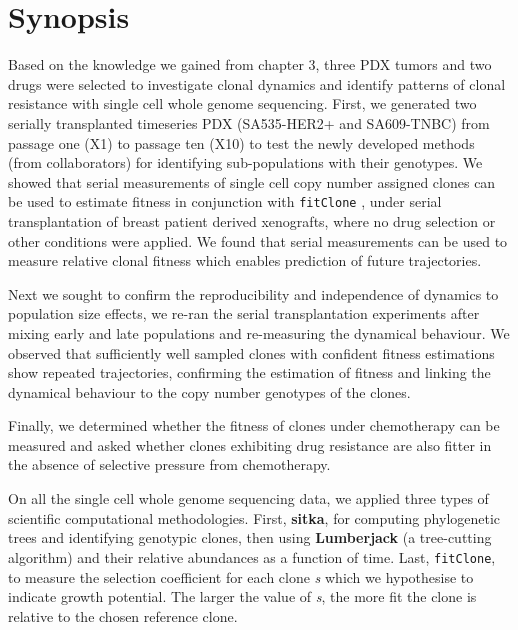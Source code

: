 \section{Synopsis}
Based on the knowledge we gained from chapter 3, three \ac{PDX} tumors and two drugs were selected to investigate clonal dynamics and identify patterns of clonal resistance with single cell whole genome sequencing. First, we generated two serially transplanted timeseries PDX (SA535-HER2+ and SA609-TNBC) from passage one (X1) to passage ten (X10) to test the newly developed methods (from collaborators) for identifying sub-populations with their genotypes.
We showed that serial measurements of single cell copy number assigned clones can be used to estimate fitness in conjunction with \texttt{fitClone} \cite{salehi2020single}, under serial transplantation of breast patient derived xenografts, where no drug selection or other conditions were applied. We found that serial measurements can be used to measure relative clonal fitness which enables prediction of future trajectories.

Next we sought to  confirm the reproducibility and independence of dynamics to population size effects, we re-ran the serial transplantation experiments after mixing early and late populations and re-measuring the dynamical behaviour. We observed that sufficiently well sampled clones with confident fitness estimations show repeated trajectories, confirming the estimation of fitness and linking the dynamical behaviour to the copy number genotypes of the clones.

Finally, we determined whether the fitness of clones under chemotherapy can be measured and asked whether clones exhibiting drug resistance are also fitter in the absence of selective pressure from chemotherapy. 

On all the single cell whole genome sequencing data, we applied three types of scientific computational methodologies. First, \textbf{sitka},  for computing phylogenetic trees and identifying genotypic clones, then using \textbf{Lumberjack} (a tree-cutting algorithm) and their relative abundances as a function of time. Last, \texttt{fitClone}, to measure the selection coefficient for each clone \textit{s} which we hypothesise to indicate growth potential. The larger the value of \textit{s}, the more fit the clone is relative to the chosen reference clone. 






